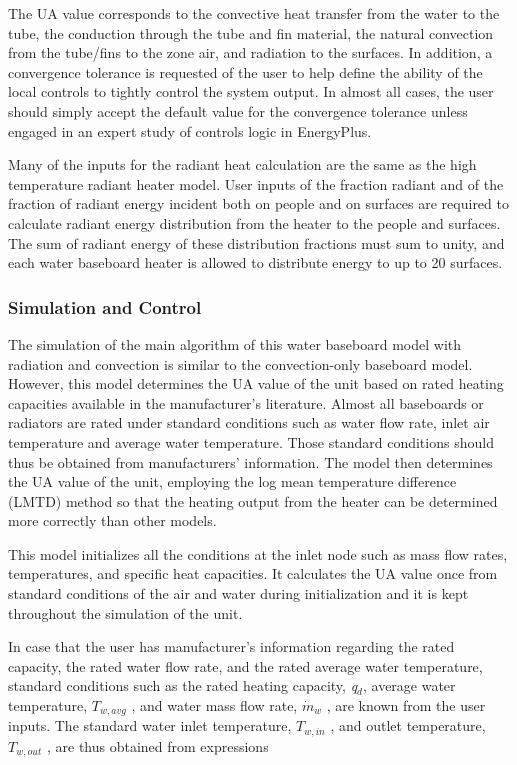 The UA value corresponds to the convective heat transfer from the water to the tube, the conduction through the tube and fin material, the natural convection from the tube/fins to the zone air, and radiation to the surfaces. In addition, a convergence tolerance is requested of the user to help define the ability of the local controls to tightly control the system output. In almost all cases, the user should simply accept the default value for the convergence tolerance unless engaged in an expert study of controls logic in EnergyPlus.

Many of the inputs for the radiant heat calculation are the same as the high temperature radiant heater model. User inputs of the fraction radiant and of the fraction of radiant energy incident both on people and on surfaces are required to calculate radiant energy distribution from the heater to the people and surfaces. The sum of radiant energy of these distribution fractions must sum to unity, and each water baseboard heater is allowed to distribute energy to up to 20 surfaces.

\subsubsection{Simulation and Control}\label{simulation-and-control-2-000}

The simulation of the main algorithm of this water baseboard model with radiation and convection is similar to the convection-only baseboard model. However, this model determines the UA value of the unit based on rated heating capacities available in the manufacturer's literature. Almost all baseboards or radiators are rated under standard conditions such as water flow rate, inlet air temperature and average water temperature. Those standard conditions should thus be obtained from manufacturers' information. The model then determines the UA value of the unit, employing the log mean temperature difference (LMTD) method so that the heating output from the heater can be determined more correctly than other models.

This model initializes all the conditions at the inlet node such as mass flow rates, temperatures, and specific heat capacities. It calculates the UA value once from standard conditions of the air and water during initialization and it is kept throughout the simulation of the unit.

In case that the user has manufacturer's information regarding the rated capacity, the rated water flow rate, and the rated average water temperature, standard conditions such as the rated heating capacity, \emph{q\(_{d}\)}, average water temperature, \({T_{w,avg}}\) , and water mass flow rate, \(\dot m{}_w\) , are known from the user inputs. The standard water inlet temperature, \({T_{w,in}}\) , and outlet temperature, \({T_{w,out}}\) , are thus obtained from expressions


